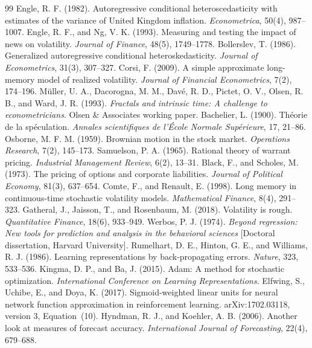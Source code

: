 \documentclass[12pt,a4paper]{article}
\numberwithin{equation}{section}
\numberwithin{table}{section}
\numberwithin{figure}{section}
\begin{document}
\begin{thebibliography}{99}
 Engle, R. F. (1982). Autoregressive conditional heteroscedasticity with estimates of the variance of United Kingdom inflation. \emph{Econometrica}, 50(4), 987--1007.
 Engle, R. F., and Ng, V. K. (1993). Measuring and testing the impact of news on volatility. \emph{Journal of Finance}, 48(5), 1749--1778.
 Bollerslev, T. (1986). Generalized autoregressive conditional heteroskedasticity. \emph{Journal of Econometrics}, 31(3), 307--327.
 Corsi, F. (2009). A simple approximate long-memory model of realized volatility. \emph{Journal of Financial Econometrics}, 7(2), 174--196.
 M\"uller, U. A., Dacorogna, M. M., Dav\'e, R. D., Pictet, O. V., Olsen, R. B., and Ward, J. R. (1993). \emph{Fractals and intrinsic time: A challenge to econometricians}. Olsen \& Associates working paper.
 Bachelier, L. (1900). Th\'eorie de la sp\'eculation. \emph{Annales scientifiques de l'\'Ecole Normale Sup\'erieure}, 17, 21--86.
 Osborne, M. F. M. (1959). Brownian motion in the stock market. \emph{Operations Research}, 7(2), 145--173.
 Samuelson, P. A. (1965). Rational theory of warrant pricing. \emph{Industrial Management Review}, 6(2), 13--31.
 Black, F., and Scholes, M. (1973). The pricing of options and corporate liabilities. \emph{Journal of Political Economy}, 81(3), 637--654.
 Comte, F., and Renault, E. (1998). Long memory in continuous-time stochastic volatility models. \emph{Mathematical Finance}, 8(4), 291--323.
 Gatheral, J., Jaisson, T., and Rosenbaum, M. (2018). Volatility is rough. \emph{Quantitative Finance}, 18(6), 933--949.
 Werbos, P. J. (1974). \emph{Beyond regression: New tools for prediction and analysis in the behavioral sciences} [Doctoral dissertation, Harvard University].
 Rumelhart, D. E., Hinton, G. E., and Williams, R. J. (1986). Learning representations by back-propagating errors. \emph{Nature}, 323, 533--536.
 Kingma, D. P., and Ba, J. (2015). Adam: A method for stochastic optimization. \emph{International Conference on Learning Representations}.
 Elfwing, S., Uchibe, E., and Doya, K. (2017). Sigmoid-weighted linear units for neural network function approximation in reinforcement learning. arXiv:1702.03118, version 3, Equation~(10).
 Hyndman, R. J., and Koehler, A. B. (2006). Another look at measures of forecast accuracy. \emph{International Journal of Forecasting}, 22(4), 679--688.

\end{thebibliography}
\end{document}
